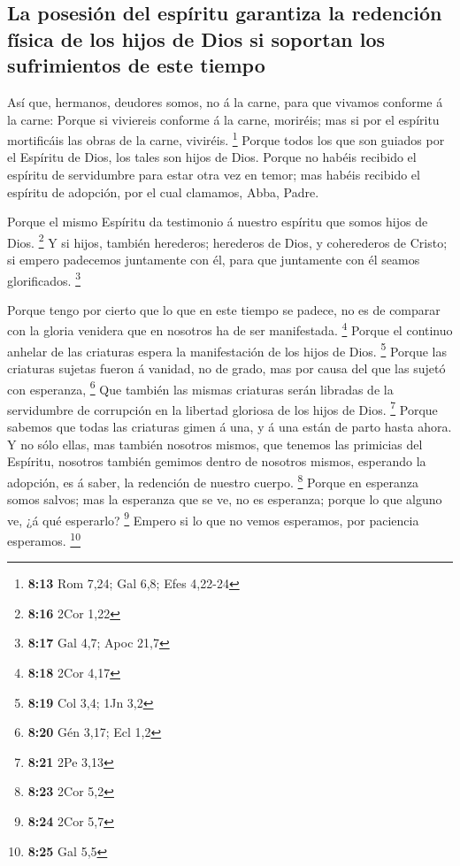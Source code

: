 \hypertarget{la-posesiuxf3n-del-espuxedritu-garantiza-la-redenciuxf3n-fuxedsica-de-los-hijos-de-dios-si-soportan-los-sufrimientos-de-este-tiempo}{%
\subsection{La posesión del espíritu garantiza la redención física de
los hijos de Dios si soportan los sufrimientos de este
tiempo}\label{la-posesiuxf3n-del-espuxedritu-garantiza-la-redenciuxf3n-fuxedsica-de-los-hijos-de-dios-si-soportan-los-sufrimientos-de-este-tiempo}}

 Así que, hermanos, deudores somos, no á la carne, para
que vivamos conforme á la carne:  Porque si viviereis
conforme á la carne, moriréis; mas si por el espíritu mortificáis las
obras de la carne, viviréis. \footnote{\textbf{8:13} Rom 7,24; Gal 6,8;
  Efes 4,22-24}  Porque todos los que son guiados por el
Espíritu de Dios, los tales son hijos de Dios.  Porque no
habéis recibido el espíritu de servidumbre para estar otra vez en temor;
mas habéis recibido el espíritu de adopción, por el cual clamamos, Abba,
Padre.

 Porque el mismo Espíritu da testimonio á nuestro
espíritu que somos hijos de Dios. \footnote{\textbf{8:16} 2Cor 1,22}
 Y si hijos, también herederos; herederos de Dios, y
coherederos de Cristo; si empero padecemos juntamente con él, para que
juntamente con él seamos glorificados. \footnote{\textbf{8:17} Gal 4,7;
  Apoc 21,7}

 Porque tengo por cierto que lo que en este tiempo se
padece, no es de comparar con la gloria venidera que en nosotros ha de
ser manifestada. \footnote{\textbf{8:18} 2Cor 4,17} 
Porque el continuo anhelar de las criaturas espera la manifestación de
los hijos de Dios. \footnote{\textbf{8:19} Col 3,4; 1Jn 3,2}
 Porque las criaturas sujetas fueron á vanidad, no de
grado, mas por causa del que las sujetó con esperanza, \footnote{\textbf{8:20}
  Gén 3,17; Ecl 1,2}  Que también las mismas criaturas
serán libradas de la servidumbre de corrupción en la libertad gloriosa
de los hijos de Dios. \footnote{\textbf{8:21} 2Pe 3,13} 
Porque sabemos que todas las criaturas gimen á una, y á una están de
parto hasta ahora.  Y no sólo ellas, mas también nosotros
mismos, que tenemos las primicias del Espíritu, nosotros también gemimos
dentro de nosotros mismos, esperando la adopción, es á saber, la
redención de nuestro cuerpo. \footnote{\textbf{8:23} 2Cor 5,2}
 Porque en esperanza somos salvos; mas la esperanza que
se ve, no es esperanza; porque lo que alguno ve, ¿á qué esperarlo?
\footnote{\textbf{8:24} 2Cor 5,7}  Empero si lo que no
vemos esperamos, por paciencia esperamos. \footnote{\textbf{8:25} Gal
  5,5}

